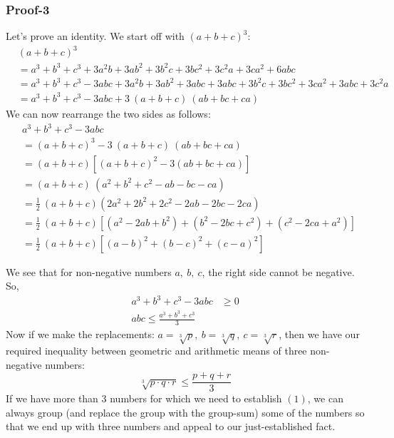 \documentclass{article}
\begin{document}
\subsubsection*{Proof-3}
Let's prove an identity. We start off with $(a+b+c)^3$:
\begin{equation*}
	\begin{aligned}
		&(a+b+c)^3\\
		&= a^3 + b^3 + c^3 + 3 a^2 b + 3 a b^2 + 3 b^2 c + 3 b c^2 + 3 c^2 a + 3 c a^2 + 6 abc\\
		&= a^3 + b^3 + c^3 - 3abc + 3 a^2 b + 3 a b^2 + 3 abc + 3 abc + 3 b^2 c + 3 b c^2 + 3 c a^2 + 3 abc + 3 c^2 a\\
		&= a^3 + b^3 + c^3 - 3abc + 3\ (a+b+c)\ (ab+bc+ca)
	\end{aligned}
\end{equation*}
We can now rearrange the two sides as follows:
\begin{equation*}
	\begin{aligned}
		&a^3 + b^3 + c^3 - 3abc\\
		&= (a+b+c)^3 - 3\ (a+b+c)\ (ab+bc+ca)\\
		&= (a+b+c) \left[ (a+b+c)^2 - 3(ab + bc + ca) \right]\\
		&= (a+b+c)\ \left( a^2+b^2+c^2 - ab - bc - ca \right)\\
		&= \frac{1}{2}\ (a+b+c) \left( 2a^2 + 2b^2 + 2c^2 - 2ab - 2bc - 2ca \right)\\
		&= \frac{1}{2}\ (a+b+c) \left[ \left(a^2-2ab+b^2\right) + \left( b^2 - 2bc + c^2 \right) + \left( c^2 - 2ca + a^2 \right) \right]\\
		&= \frac{1}{2}\ (a+b+c) \left[ (a-b)^2 + (b-c)^2 + (c-a)^2 \right]
	\end{aligned}
\end{equation*}

We see that for non-negative numbers $a,\ b,\ c$, the right side cannot be negative. So,
\begin{equation*}
	\begin{aligned}
		a^3 + b^3 + c^3 - 3abc &\geq 0\\
		abc \leq \frac{a^3+b^3+c^3}{3}
	\end{aligned}
\end{equation*}
Now if we make the replacements: $a = \sqrt[3]{p},\ b = \sqrt[3]{q},\ c = \sqrt[3]{r}$, then we have our required inequality between geometric and arithmetic means of three non-negative numbers:
\[
	\sqrt[3]{p \cdot q \cdot r} \leq \frac{p+q+r}{3}
\]
If we have more than 3 numbers for which we need to establish  $(1)$, we can always group (and replace the group with the group-sum) some of the numbers so that we end up with three numbers and appeal to our just-established fact.
\end{document}
